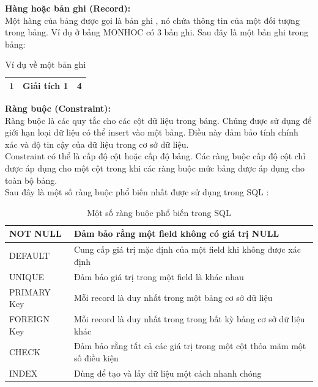 \textbf{Hàng hoặc bản ghi (Record):}\\
	
Một hàng của bảng được gọi là bản ghi , nó chứa thông tin của một đối tượng trong bảng. Ví dụ ở bảng MONHOC có 3 bản ghi. Sau đây là một bản ghi trong bảng:\\
\begin{table}[!h]
    \centering
    \begin{tabular}{|r|r|r|}
        \hline
		1&Giải tích 1&4\\
		\hline
    \end{tabular}
    \caption{Ví dụ về một bản ghi}
\end{table}

\textbf{Ràng buộc (Constraint):}\\

Ràng buộc là các quy tắc cho các cột dữ liệu trong bảng. Chúng được sử dụng để giới hạn loại dữ liệu có thể insert vào một bảng. Điều này đảm bảo tính chính xác và độ tin cậy của dữ liệu trong cơ sở dữ liệu.\\
Constraint có thể là cấp độ cột hoặc cấp độ bảng. Các ràng buộc cấp độ cột chỉ được áp dụng cho một
cột trong khi các ràng buộc mức bảng được áp dụng cho toàn bộ bảng.\\
Sau đây là một số ràng buộc phổ biến nhất được sử dụng trong SQL :\\
\begin{table}[!h]
    \centering
    \begin{tabular}{|l|l|}
        \hline
         NOT NULL&Đảm bảo rằng một field không có giá trị NULL  \\
         \hline
         DEFAULT&Cung cấp giá trị mặc định của một field khi không được xác định\\
         \hline
         UNIQUE&Đảm bảo giá trị trong một field là khác nhau\\
         \hline
         PRIMARY Key&Mỗi record là duy nhất trong một bảng cơ sở dữ liệu\\
         \hline
         FOREIGN Key&Mỗi record là duy nhất trong trong bất kỳ bảng cơ sở dữ liệu khác\\
         \hline
         CHECK&Đảm bảo rằng tất cả các giá trị trong một cột thỏa mãm một số điều kiện\\
         \hline
         INDEX&Dùng để tạo và lấy dữ liệu một cách nhanh chóng\\
         \hline
    \end{tabular}
    \caption{Một số ràng buộc phổ biến trong SQL}
\end{table}
